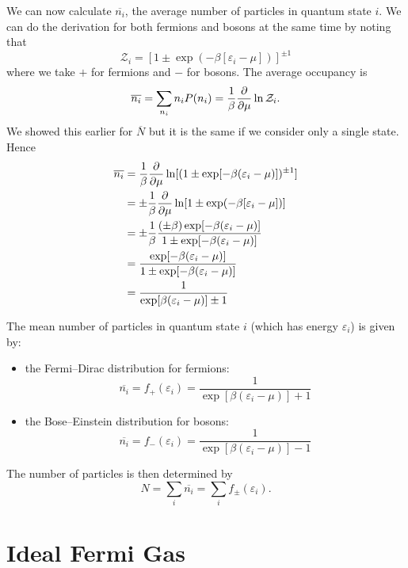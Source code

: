 \documentclass[a4paper]{article}
\newcommand{\mean}[1]{\overline{#1}}
\newcommand{\partition}{\mathcal{Z}}
\newcounter{keypointcounter}
\newenvironment{keypoint}{%
    \stepcounter{keypointcounter}
    \begin{tcolorbox}[breakable, title=Key Point \thekeypointcounter]
}{%
    \end{tcolorbox}
}
\begin{document}
    We can now calculate \(\mean{n_i}\), the average number of particles in quantum state \(i\).
    We can do the derivation for both fermions and bosons at the same time by noting that
    \[\partition_i = [1 \pm \exp(-\beta[\varepsilon_i - \mu])]^{\pm 1}\]
    where we take \(+\) for fermions and \(-\) for bosons.
    The average occupancy is
    \[\mean{n_i} = \sum_{n_i} n_iP(n_i) = \frac{1}{\beta}\pdv{\mu}\ln\partition_i.\]
    We showed this earlier for \(\mean{N}\) but it is the same if we consider only a single state.
    Hence
    \begin{align*}
        \mean{n_i} &= \frac{1}{\beta}\pdv{\mu} \ln[(1 \pm \exp[-\beta(\varepsilon_i - \mu)])^{\pm 1}]\\
        &= \pm\frac{1}{\beta}\pdv{\mu} \ln[1 \pm \exp(-\beta[\varepsilon_i - \mu])]\\
        &= \pm\frac{1}{\beta}\frac{(\pm\beta)\exp[-\beta(\varepsilon_i - \mu)]}{1 \pm \exp[-\beta(\varepsilon_i - \mu)]}\\
        &= \frac{\exp[-\beta(\varepsilon_i - \mu)]}{1 \pm \exp[-\beta(\varepsilon_i - \mu)]}\\
        &= \frac{1}{\exp[\beta(\varepsilon_i - \mu)] \pm 1}
    \end{align*}
    \begin{keypoint}
        The mean number of particles in quantum state \(i\) (which has energy \(\varepsilon_i\)) is given by:
        \begin{itemize}
            \item the Fermi--Dirac distribution for fermions:
            \[\mean{n_i} = f_{+}(\varepsilon_i) = \frac{1}{\exp[\beta(\varepsilon_i - \mu)] + 1}\]
            \item the Bose--Einstein distribution for bosons:
            \[\mean{n_i} = f_{-}(\varepsilon_i) = \frac{1}{\exp[\beta(\varepsilon_i - \mu)] - 1}\]
        \end{itemize}
    \end{keypoint}
    The number of particles is then determined by
    \[N = \sum_i \mean{n_i} = \sum_i f_{\pm}(\varepsilon_i).\]
    
    \section{Ideal Fermi Gas}
\end{document}
